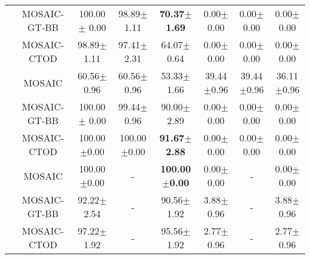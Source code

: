 \begin{table}[t]
{\begin{tabular}{|c|c|c|c|c|c|c|c|}
  \cline{2-8}
   & MOSAIC-GT-BB & 100.00$\pm$   0.00 & 98.89$\pm$   1.11 & \textbf{70.37$\pm$1.69} & 0.00$\pm$   0.00 & 0.00$\pm$   0.00 & 0.00$\pm$   0.00 \\ 
  \cline{2-8}
   & MOSAIC-CTOD & 98.89$\pm$1.11 & 97.41$\pm$2.31 & 64.07$\pm$0.64 & 0.00$\pm$0.00 & 0.00$\pm$0.00 & 0.00$\pm$0.00 \\ 
  \hhline{|========|}
  \multirow{3}{*}{Stack-Block} & MOSAIC & 60.56$\pm$0.96 & 60.56$\pm$0.96 & 53.33$\pm$1.66 & 39.44$\pm$0.96 & 39.44$\pm$0.96 & 36.11$\pm$0.96 \\ 
  \cline{2-8}
   & MOSAIC-GT-BB & 100.00$\pm$   0.00 & 99.44$\pm$   0.96 & 90.00$\pm$   2.89 & 0.00$\pm$   0.00 & 0.00$\pm$   0.00 & 0.00$\pm$   0.00 \\ 
  \cline{2-8}
   & MOSAIC-CTOD & 100.00$\pm$0.00 & 100.00$\pm$0.00 & \textbf{91.67$\pm$2.88} & 0.00$\pm$0.00 & 0.00$\pm$0.00 & 0.00$\pm$0.00 \\ 
  \hhline{|========|}
  \multirow{3}{*}{Press-Button} & MOSAIC & 100.00$\pm$0.00 & - & \textbf{100.00$\pm$0.00} & 0.00$\pm$0.00 & - & 0.00$\pm$0.00 \\ 
  \cline{2-8}
   & MOSAIC-GT-BB & 92.22$\pm$   2.54 & - & 90.56$\pm$   1.92 & 3.88$\pm$   0.96 & - & 3.88$\pm$   0.96 \\ 
  \cline{2-8}
   & MOSAIC-CTOD & 97.22$\pm$1.92 & - & 95.56$\pm$1.92 & 2.77$\pm$0.96 & - & 2.77$\pm$0.96 \\
  \hline
  \end{tabular}
  }
  \end{table}